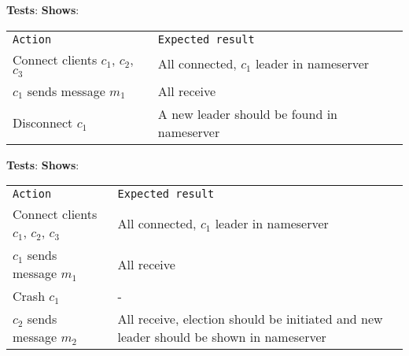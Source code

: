 

	\textbf{Tests}:
	\textbf{Shows}:

	\begin{tabular}{ll}
		\texttt{Action} & \texttt{Expected result} \\
		Connect clients $c_1$, $c_2$, $c_3$ & All connected, $c_1$ leader in nameserver \\
		$c_1$ sends message $m_1$ & All receive \\
		Disconnect $c_1$ & A new leader should be found in nameserver \\
	\end{tabular}

	\textbf{Tests}:
	\textbf{Shows}:

	\begin{tabular}{ll}
		\texttt{Action} & \texttt{Expected result} \\
		Connect clients $c_1$, $c_2$, $c_3$ & All connected, $c_1$ leader in nameserver \\
		$c_1$ sends message $m_1$ & All receive \\
		Crash $c_1$ & - \\
		$c_2$ sends message $m_2$ & All receive, election should be initiated and new leader should be shown in nameserver \\
	\end{tabular}







